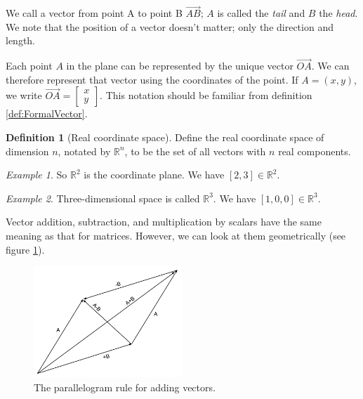 \documentclass[10pt, a4paper]{amsart}
\theoremstyle{definition}
\newtheorem{defn}{Definition}
\theoremstyle{remark}
\newtheorem{ex}{Example}
\begin{document}
We call a vector from point A to point B $ \overrightarrow{AB} $; $ A $ is called the \emph{tail}
and $ B $ the \emph{head}. We note that the position of a vector doesn't matter; only
the direction and length.

Each point $ A $ in the plane can be represented by the unique vector $ \overrightarrow{OA} $. We can therefore
represent that vector using the coordinates of the point. If $ A = (x, y) $, we write $ \overrightarrow{OA} = \begin{bmatrix} x \\ y \end{bmatrix} $.
This notation should be familiar from definition \ref{def:FormalVector}.

\begin{defn}[Real coordinate space]
  Define the real coordinate space of dimension $ n $, notated by $ \mathbb{R}^n $, to be
  the set of all vectors with $ n $ real components.
\end{defn}

\begin{ex}
  So $ \mathbb{R}^2 $ is the coordinate plane. We have $ [2, 3] \in \mathbb{R}^2 $.
\end{ex}

\begin{ex}
  Three-dimensional space is called $ \mathbb{R}^3 $. We have $ [1, 0, 0] \in \mathbb{R}^3 $.
\end{ex}

Vector addition, subtraction, and multiplication by scalars have the same meaning as that for
matrices. However, we can look at them geometrically (see figure \ref{fig:VectorAddition}).

\begin{figure}
  \includegraphics[width=0.5\textwidth]{vectors}
  \caption{The parallelogram rule for adding vectors.}
  \label{fig:VectorAddition}
\end{figure}
\end{document}
